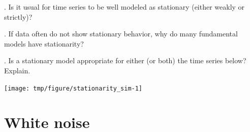\begin{frame}[fragile]

\myquestion. Is it usual for time series to be well modeled as stationary (either weakly or strictly)?


\myquestion. If data often do not show stationary behavior, why do many fundamental models have stationarity?


\end{frame} 

\begin{frame}[fragile]

\vspace{-1.5mm}


\myquestion. Is a stationary model appropriate for either (or both) the time series below? Explain.


\begin{knitrout}\small
{}\color{fgcolor}

{\centering \texttt{[image: tmp/figure/stationarity\_sim-1]} 

}


\end{knitrout}


\end{frame}

\section{White noise}

